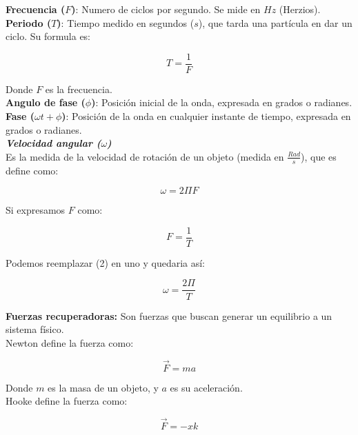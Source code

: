 \documentclass{article}
\begin{document}
\textbf{Frecuencia ($F$)}: Numero de ciclos por segundo. Se mide en $Hz$ (Herzios).\\

\textbf{Periodo ($T$)}: Tiempo medido en segundos ($s$), que tarda una partícula en dar un ciclo. Su formula es:

\[ T = \frac{1}{F} \]

Donde $F$ es la frecuencia.\\

\textbf{Angulo de fase ($\phi$)}: Posición inicial de la onda, expresada en grados o radianes.\\

\textbf{Fase ($\omega t + \phi$)}: Posición de la onda en cualquier instante de tiempo, expresada en grados o radianes.\\

\textbf{\textit{Velocidad angular ($\omega$)}}\\

Es la medida de la velocidad de rotación de un objeto (medida en $\frac{Rad}{s}$), que es define como:

\begin{equation}
   \omega = 2\Pi F
\end{equation}

Si expresamos $F$ como:

\begin{equation}
    F = \frac{1}{T}
\end{equation}

Podemos reemplazar (2) en uno y quedaria así:

\begin{equation}
    \omega = \frac{2\Pi}{T}
\end{equation}
 
\textbf{Fuerzas recuperadoras:} Son fuerzas que buscan generar un equilibrio a un sistema físico.\\

Newton define la fuerza como:

\begin{equation}
    \vec{F} = ma
\end{equation}

Donde $m$ es la masa de un objeto, y $a$ es su aceleración.\\

Hooke define la fuerza como:

\begin{equation}
    \vec{F} = -xk
\end{equation}
\end{document}
